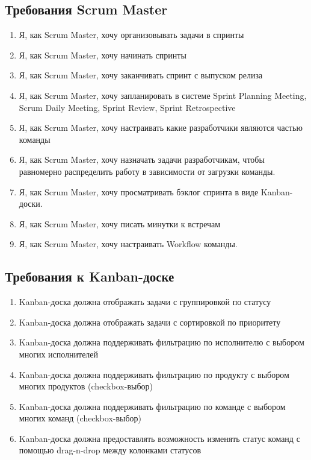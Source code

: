 \documentclass{article}
\begin{document}
\subsection{Требования Scrum Master}
\begin{enumerate}[label=\textbf{SMR\arabic*}.]
	\item Я, как Scrum Master, хочу организовывать задачи в спринты
	\item Я, как Scrum Master, хочу начинать спринты
	\item Я, как Scrum Master, хочу заканчивать спринт с выпуском релиза
	\item Я, как Scrum Master, хочу запланировать в системе
	      Sprint Planning Meeting, Scrum Daily Meeting, Sprint Review, Sprint Retrospective
	\item Я, как Scrum Master, хочу настраивать какие разработчики являются частью команды
	\item Я, как Scrum Master, хочу назначать задачи разработчикам, чтобы равномерно распределить работу в зависимости от загрузки команды.
	\item Я, как Scrum Master, хочу просматривать бэклог спринта в виде Kanban-доски.
	\item Я, как Scrum Master, хочу писать минутки к встречам
	\item Я, как Scrum Master, хочу настраивать Workflow команды.
\end{enumerate}

\subsection{Требования к Kanban-доске}
\begin{enumerate}[label=\textbf{KBR\arabic*}.]
	\item Kanban-доска должна отображать задачи с группировкой по статусу
	\item Kanban-доска должна отображать задачи с сортировкой по приоритету
	\item Kanban-доска должна поддерживать фильтрацию по исполнителю с выбором
	      многих исполнителей
	\item Kanban-доска должна поддерживать фильтрацию по продукту с выбором
	      многих продуктов (checkbox-выбор)
	\item Kanban-доска должна поддерживать фильтрацию по команде с выбором
	      многих команд (checkbox-выбор)
	\item Kanban-доска должна предоставлять возможность изменять статус
	      команд с помощью drag-n-drop между колонками статусов
\end{enumerate}
\end{document}
